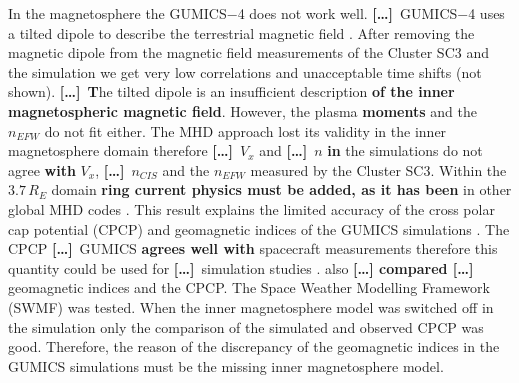 \documentclass[linenumbers,draft]{agujournal}
\newcommand{\del}{\textbf{[\dots]}\ } %
\begin{document}
In the magnetosphere the GUMICS$-$4 does not work well. \del GUMICS$-$4 uses a tilted dipole to describe the terrestrial magnetic field \citep{janhunen12:_gumic_mhd}. After removing the magnetic dipole from the magnetic field measurements of the Cluster SC3 and the simulation we get very low correlations and unacceptable time shifts (not shown). \del \textbf{T}he tilted dipole is an insufficient description \textbf{of the inner magnetospheric magnetic field}. However, the plasma \textbf{moments} and the $n_{EFW}$ do not fit either. The MHD approach lost its validity in the inner magnetosphere domain therefore \del $V_{x}$ and \del $n$ \textbf{in} the simulations do not agree \textbf{with} $V_{x}$, \del $n_{CIS}$ and the $n_{EFW}$ measured by the Cluster SC3. Within the $3.7\,R_{E}$ domain \textbf{ring current physics must be added, as it has been} in other global MHD codes \citep{lyon04:_lyon_fedder_mobar_lfm_mhd,raeder08:_openg_simul_themis_mission,powell99:_solut_adapt_upwin_schem_ideal_magnet,toth12:_adapt}. This result explains the limited accuracy of the cross polar cap potential (CPCP) and  geomagnetic indices of the GUMICS simulations \citep{juusola14:_statis_gumic_mhd}. The CPCP \del GUMICS \textbf{agrees well with} spacecraft measurements therefore this quantity could be used for \del simulation studies \citep{lakka18:_cross_polar_cap_satur_gumic}. \citet{haiducek17:_swmf_global_magnet_simul_januar} also \textbf{[\dots] compared [\dots]} geomagnetic indices and the CPCP. The Space Weather Modelling Framework (SWMF) was tested. When the inner magnetosphere model was switched off in the simulation only the comparison of the simulated and observed CPCP was good. Therefore, the reason of the discrepancy of the geomagnetic indices in the GUMICS simulations must be the missing inner magnetosphere model.

\bf %
\end{document}
